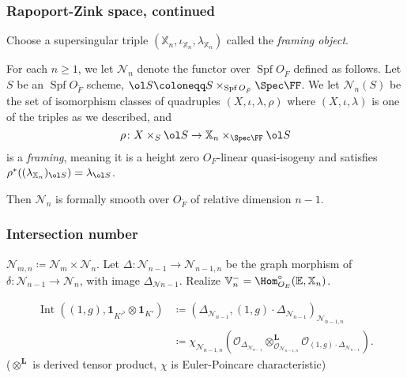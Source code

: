 \documentclass[11pt]{beamer}
\DeclareMathOperator{\Int}{Int}
\DeclareMathOperator{\Spf}{Spf}
\newcommand{\EE}{\mathbb{E}}
\newcommand{\VV}{\mathbb{V}}
\newcommand{\XX}{\mathbb{X}}
\renewcommand{\OO}{O}
\newcommand{\RZ}{\mathcal{N}}
\newcommand{\Sheaf}{\mathcal O}
\newcommand{\jiao}{\mathop{\otimes}^{\mathbf{L}}} %
\begin{document}
\begin{frame}
  \frametitle{Rapoport-Zink space, continued}
  Choose a supersingular triple $(\XX_n, \iota_{\XX_n}, \lambda_{\XX_n})$
  called the \emph{framing object}.
  \begin{definition}
    For each $n \ge 1$, we let $\RZ_n$ denote the
    functor over $\Spf \OO_{\breve F}$ defined as follows.
    Let $S$ be an $\Spf \OO_{\breve F}$ scheme,
    $\ol S \coloneqq S \times_{\Spf \OO_{\breve F}} \Spec \FF$.
    We let $\RZ_n(S)$ be the set of isomorphism classes of quadruples
    $(X, \iota, \lambda, \rho)$
    where $(X, \iota, \lambda)$ is one of the triples as we described, and
    \[ \rho \colon X \times_S \ol S \to \XX_n \times_{\Spec \FF} \ol S \]
    is a \emph{framing}, meaning it is a height zero $\OO_F$-linear quasi-isogeny
    and satisfies $\rho^\ast((\lambda_{\XX_n})_{\ol S}) = \lambda_{\ol S}$.
  \end{definition}
  Then $\RZ_n$ is formally smooth over $\OO_{\breve F}$ of relative dimension $n-1$.

\end{frame}
\begin{frame}
  \frametitle{Intersection number}
  \begin{itemize}
    \ii $\RZ_{m,n} \coloneqq \RZ_m \times \RZ_n$.
    \ii Let $\Delta \colon \RZ_{n-1} \to \RZ_{n-1,n}$
    be the graph morphism of $\delta \colon \RZ_{n-1} \to \RZ_n$,
    with image $\Delta_{\RZ{n-1}}$.
    \ii Realize $\VV_n^- = \Hom_{\OO_E}^\circ(\EE, \XX_n)$.
  \end{itemize}

  \begin{definition}
    \begin{align*}
      \Int((1,g), \mathbf{1}_{K'^\flat} \otimes \mathbf{1}_{K'})
      &\coloneqq \left( \Delta_{\RZ_{n-1}}, (1,g) \cdot \Delta_{\RZ_{n-1}} \right)_{\RZ_{n-1,n}} \\
      &\coloneqq \chi_{\RZ_{n-1,n}}
      \left( \Sheaf_{\Delta_{\RZ_{n-1}}} \jiao_{\Sheaf_{\RZ_{n-1,n}}} \Sheaf_{(1,g) \cdot \Delta_{\RZ_{n-1}}} \right) .
    \end{align*}
    ($\jiao$ is derived tensor product, $\chi$ is Euler-Poincare characteristic)
  \end{definition}

\end{frame}
\end{document}
